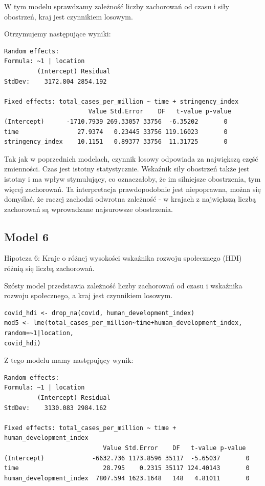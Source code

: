 \documentclass[12pt]{mwbk}
\theoremstyle{plain}
\theoremstyle{definition}
\theoremstyle{remark}
\begin{document}
W tym modelu sprawdzamy zależność liczby zachorowań od czasu i siły obostrzeń, kraj jest czynnikiem losowym.

Otrzymujemy następujące wyniki:
\begin{verbatim}
Random effects:
Formula: ~1 | location
         (Intercept) Residual
StdDev:    3172.804 2854.192

Fixed effects: total_cases_per_million ~ time + stringency_index 
                       Value Std.Error    DF   t-value p-value
(Intercept)      -1710.7939 269.33057 33756  -6.35202       0
time                27.9374   0.23445 33756 119.16023       0
stringency_index    10.1151   0.89377 33756  11.31725       0
\end{verbatim}

Tak jak w poprzednich modelach, czynnik losowy odpowiada za największą część zmienności. Czas jest istotny statystycznie. Wskaźnik siły obostrzeń także jest istotny i ma wpływ stymulujący, co oznaczałoby, że im silniejsze obostrzenia, tym więcej zachorowań. Ta interpretacja prawdopodobnie jest niepoprawna, można się domyślać, że raczej zachodzi odwrotna zależność - w krajach z największą liczbą zachorowań są wprowadzane najsurowsze obostrzenia.

\subsection{Model 6}

Hipoteza 6: Kraje o różnej wysokości wskaźnika rozwoju społecznego (HDI) różnią się liczbą zachorowań.

Szósty model przedstawia zależność liczby zachorowań od czasu i wskaźnika rozwoju społecznego, a kraj jest czynnikiem losowym.

\begin{verbatim}
covid_hdi <- drop_na(covid, human_development_index)
mod5 <- lme(total_cases_per_million~time+human_development_index,
random=~1|location,
covid_hdi)
\end{verbatim}

Z tego modelu mamy następujący wynik:

\begin{verbatim}
Random effects:
Formula: ~1 | location
         (Intercept) Residual
StdDev:    3130.083 2984.162

Fixed effects: total_cases_per_million ~ time + human_development_index 
                           Value Std.Error    DF   t-value p-value
(Intercept)             -6632.736 1173.8596 35117  -5.65037       0
time                       28.795    0.2315 35117 124.40143       0
human_development_index  7807.594 1623.1648   148   4.81011       0
\end{verbatim}
\end{document}
